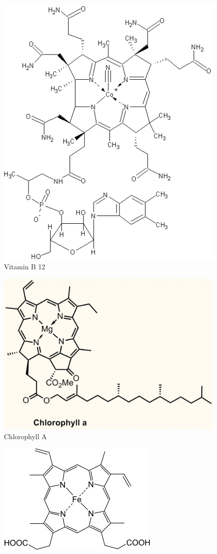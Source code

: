 \begin{figure}
\centering
\includegraphics[scale=0.5]{graphics/Vitamin_B12}
\caption{Vitamin B 12}
\end{figure}
\begin{figure}[!htpb]
\centering
\includegraphics[scale=0.5]{graphics/Chlorophylla}
\caption{Chlorophyll A}
\end{figure}

\begin{figure}[!htpb]
\centering
\includegraphics[scale=0.5]{graphics/haem3}
\end{figure}

